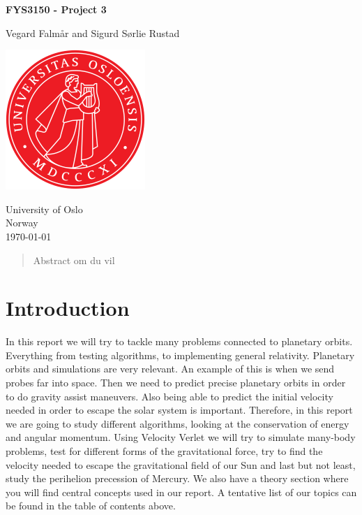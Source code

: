 \documentclass[reprint, english,notitlepage,nofootinbib]{revtex4-1}  %
\begin{document}
\begin{titlepage}
	\begin{center}
	\textbf{FYS3150 - Project 3}

	\vspace{0.2cm}
	Vegard Falmår and Sigurd Sørlie Rustad

	\vspace{0.5cm}
	\includegraphics[scale=0.5]{../../pictures/UIO}
	\vspace{0.8cm}

	University of Oslo\\
	Norway\\
	\today	\\
	\end{center}
	\tableofcontents
	\clearpage
\end{titlepage}

\begin{abstract}
Abstract om du vil
\end{abstract}
\maketitle                              %


\section{Introduction}

In this report we will try to tackle many problems connected to planetary orbits. Everything from testing algorithms, to implementing general relativity. Planetary orbits and simulations are very relevant. An example of this is when we send probes far into space. Then we need to predict precise planetary orbits in order to do gravity assist maneuvers. Also being able to predict the initial velocity needed in order to escape the solar system is important. Therefore, in this report we are going to study different algorithms, looking at the conservation of energy and angular momentum. Using Velocity Verlet we will try to simulate many-body problems, test for different forms of the gravitational force, try to find the velocity needed to escape the gravitational field of our Sun and last but not least, study the perihelion precession of Mercury. We also have a theory section where you will find central concepts used in our report. A tentative list of our topics can be found in the table of contents above.
\end{document}
